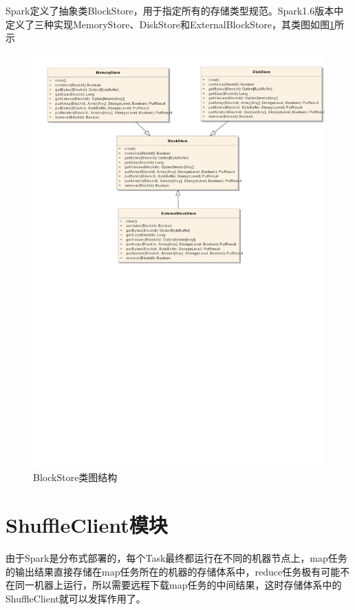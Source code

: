 Spark定义了抽象类BlockStore，用于指定所有的存储类型规范。Spark1.6版本中定义了三种实现MemoryStore、DiskStore和ExternalBlockStore，其类图如图\ref{fig:BlockStore}所示
\begin{figure}[H] 
	\centering
	\includegraphics[width=\textwidth]{figures/BlockStore.pdf}
	\caption{BlockStore类图结构}
	\label{fig:BlockStore}
\end{figure}

\section{ShuffleClient模块}
由于Spark是分布式部署的，每个Task最终都运行在不同的机器节点上，map任务的输出结果直接存储在map任务所在的机器的存储体系中，reduce任务极有可能不在同一机器上运行，所以需要远程下载map任务的中间结果，这时存储体系中的ShuffleClient就可以发挥作用了。

